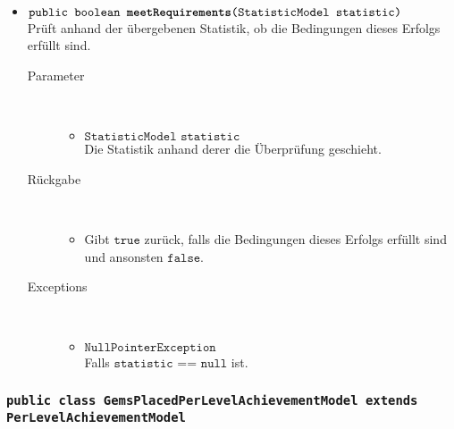\begin{description}
\begin{itemize}
				\item $\texttt{public boolean \textbf{meetRequirements}(StatisticModel statistic)}$ \\ Prüft anhand der übergebenen Statistik, ob die Bedingungen dieses Erfolgs erfüllt sind.
				\begin{description}
				\item[Parameter] \hfill \\
					\vspace{-.8cm}
					\begin{itemize}
						\item $\texttt{StatisticModel statistic}$ \\ Die Statistik anhand derer die Überprüfung geschieht. 
					\end{itemize}
					\item[Rückgabe] \hfill \\
					\vspace{-.8cm}
					\begin{itemize}
						\item Gibt $\texttt{true}$ zurück, falls die Bedingungen dieses Erfolgs erfüllt sind und ansonsten $\texttt{false}$.
					\end{itemize}
					\item[Exceptions] \hfill \\
					\vspace{-.8cm}
					\begin{itemize}
						\item $\texttt{NullPointerException}$ \\ Falls $\texttt{statistic == null}$ ist.
					\end{itemize}
				\end{description}
			\end{itemize}
		\end{description}
		
		\subsubsection{\normalfont \texttt{public class \textbf{GemsPlacedPerLevelAchievementModel} extends PerLevelAchievementModel}}
		
